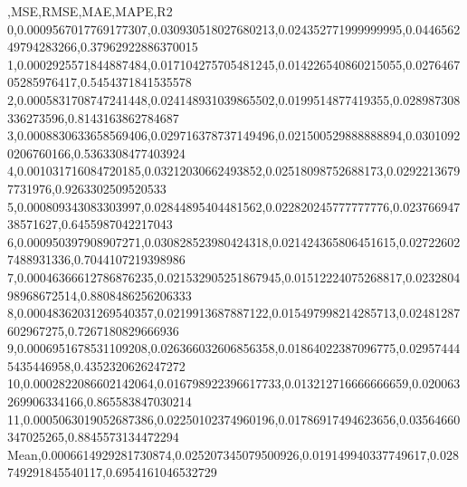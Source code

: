 ,MSE,RMSE,MAE,MAPE,R2
0,0.0009567017769177307,0.030930518027680213,0.024352771999999995,0.044656249794283266,0.37962922886370015
1,0.0002925571844887484,0.017104275705481245,0.014226540860215055,0.027646705285976417,0.5454371841535578
2,0.0005831708747241448,0.024148931039865502,0.0199514877419355,0.028987308336273596,0.8143163862784687
3,0.0008830633658569406,0.029716378737149496,0.021500529888888894,0.03010920206760166,0.5363308477403924
4,0.001031716084720185,0.03212030662493852,0.02518098752688173,0.02922136797731976,0.9263302509520533
5,0.000809343083303997,0.02844895404481562,0.022820245777777776,0.02376694738571627,0.6455987042217043
6,0.000950397908907271,0.030828523980424318,0.021424365806451615,0.027226027488931336,0.7044107219398986
7,0.00046366612786876235,0.021532905251867945,0.01512224075268817,0.023280498968672514,0.8808486256206333
8,0.00048362031269540357,0.0219913687887122,0.015497998214285713,0.02481287602967275,0.7267180829666936
9,0.0006951678531109208,0.026366032606856358,0.01864022387096775,0.029574445435446958,0.4352320626247272
10,0.0002822086602142064,0.016798922396617733,0.013212716666666659,0.020063269906334166,0.865583847030214
11,0.0005063019052687386,0.02250102374960196,0.01786917494623656,0.03564660347025265,0.8845573134472294
Mean,0.0006614929281730874,0.025207345079500926,0.019149940337749617,0.028749291845540117,0.6954161046532729
